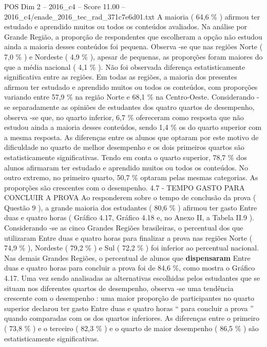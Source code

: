 \begin{textsample}{POS Dim 2 – 2016\_c4 – Score 11.00 – 2016\_c4/enade\_2016\_tec\_rad\_371c7e6d01.txt}
A maioria ( 64,6 \% ) afirmou ter estudado e aprendido muitos ou todos os conteúdos avaliados.
Na análise por Grande Região, a proporção de respondentes que escolheram a opção não estudou ainda a maioria desses conteúdos foi pequena.
Observa -se que nas regiões Norte ( 7,0 \% ) e Nordeste ( 4,9 \% ), apesar de pequenas, as proporções foram maiores do que a média nacional ( 4,1 \% ).
Não foi observada diferença estatisticamente significativa entre as regiões.
Em todas as regiões, a maioria dos presentes afirmou ter estudado e aprendido muitos ou todos os conteúdos, com proporções variando entre 57,9 \% na região Norte e 68,1 \% na Centro-Oeste.
Considerando -se separadamente as opiniões de estudantes dos quatro quartos de desempenho, observa -se que, no quarto inferior, 6,7 \% ofereceram como resposta que não estudou ainda a maioria desses conteúdos, sendo 1,4 \% os do quarto superior com a mesma resposta.
As diferenças entre os alunos que optaram por este motivo de dificuldade no quarto de melhor desempenho e os dois primeiros quartos são estatisticamente significativas.
Tendo em conta o quarto superior, 78,7 \% dos alunos afirmaram ter estudado e aprendido muitos ou todos os conteúdos.
No outro extremo, no primeiro quarto, 50,7 \% optaram pelas mesmas categorias.
As proporções são crescentes com o desempenho. 4.7 - TEMPO GASTO PARA CONCLUIR A PROVA Ao responderem sobre o tempo de conclusão da prova ( Questão 9 ), a grande maioria dos estudantes ( 80,6 \% ) afirmou ter gasto Entre duas e quatro horas ( Gráfico 4.17, Gráfico 4.18 e, no Anexo II, a Tabela II.9 ).
Considerando -se as cinco Grandes Regiões brasileiras, o percentual dos que utilizaram Entre duas e quatro horas para finalizar a prova nas regiões Norte ( 74,9 \% ), Nordeste ( 79,2 \% ) e Sul ( 72,2 \% ) foi inferior ao percentual nacional.
Nas demais Grandes Regiões, o percentual de alunos que \textbf{dispensaram} Entre duas e quatro horas para concluir a prova foi de 84,6 \%, como mostra o Gráfico 4.17.
Uma vez sendo analisadas as alternativas escolhidas pelos estudantes que se situam nos diferentes quartos de desempenho, observa -se uma tendência crescente com o desempenho : uma maior proporção de participantes no quarto superior declarou ter gasto Entre duas e quatro horas “ para concluir a prova ” quando comparadas com os dos quartos inferiores.
As diferenças entre o primeiro ( 73,8 \% ) e o terceiro ( 82,3 \% ) e o quarto de maior desempenho ( 86,5 \% ) são estatisticamente significativas.

\end{textsample}
